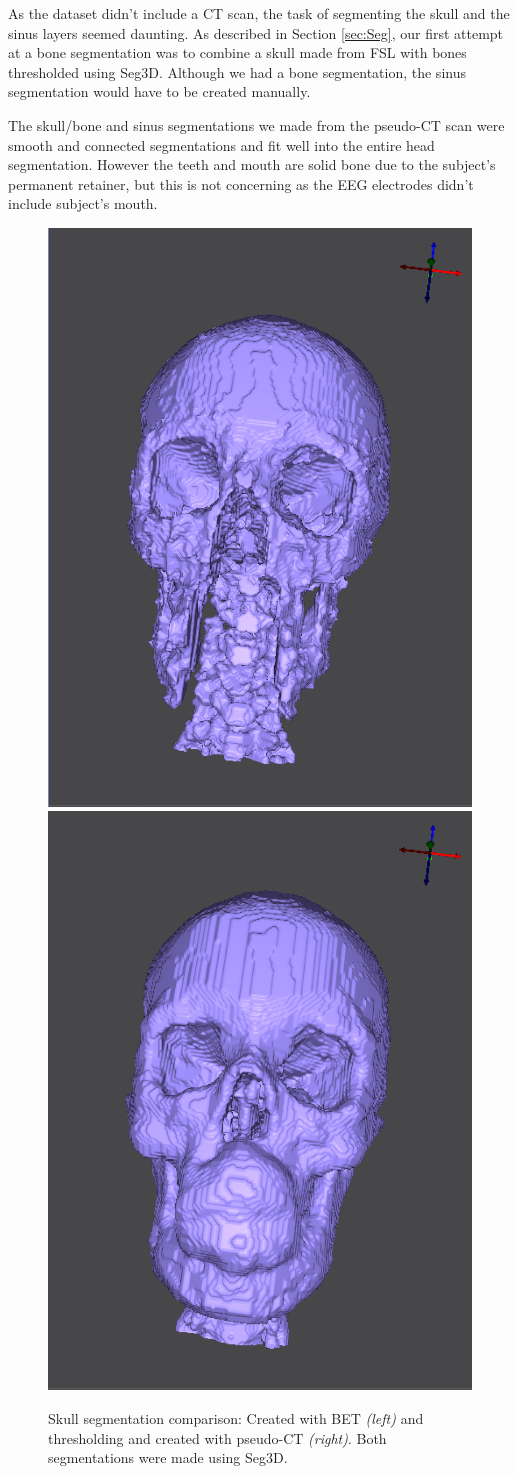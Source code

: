 As the dataset didn't include a CT scan, the task of segmenting the skull and the sinus layers seemed daunting. As described in Section \ref{sec:Seg}, our first attempt at a bone segmentation was to combine a skull made from FSL \cite{ref:bet2} with bones thresholded using Seg3D. Although we had a bone segmentation, the sinus segmentation would have to be created manually. 

The skull/bone and sinus segmentations we made from the pseudo-CT scan were smooth and connected segmentations and fit well into the entire head segmentation. However the teeth and mouth are solid bone due to the subject's permanent retainer, but this is not concerning as the EEG electrodes didn't include subject's mouth.

\begin{figure}[H]
\begin{center}
\includegraphics[width=.49\textwidth]{Figures/skull_before}
\includegraphics[width=.49\textwidth]{Figures/skull_after}
\caption{Skull segmentation comparison: Created with BET \textit{(left)} and thresholding and created with pseudo-CT \textit{(right)}. Both segmentations were made using Seg3D.}
\label{fig:skull}
\end{center}
\end{figure}

